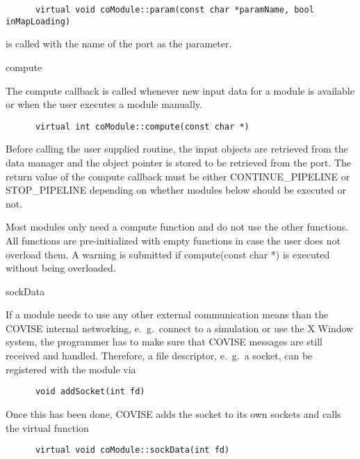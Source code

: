 \begin{verbatim}
      virtual void coModule::param(const char *paramName, bool inMapLoading)
\end{verbatim}

is called with the name of the port as the parameter.

\vspace*{1cm}
{\Large compute}
\vspace*{0.5cm}

The compute callback is called whenever new input data for a module is available or when the user executes a
module manually.
 
\begin{verbatim}
      virtual int coModule::compute(const char *)
\end{verbatim}

Before calling the user supplied routine,
the input objects are retrieved from the data manager and the object pointer is stored 
to be retrieved from the port. The return value of the compute callback must be either 
CONTINUE\_PIPELINE or STOP\_PIPELINE depending on whether modules below should be 
executed or not.

Most modules only need a compute function and do not use the other functions. All 
functions are pre-initialized with empty functions in case the user does not overload 
them. A warning is submitted if compute(const char *) is executed without being overloaded.

\vspace*{1cm}
{\Large sockData}
\vspace*{0.5cm}

If a module needs to use any other external communication means than the COVISE internal
networking, e.~g.\ connect to a simulation or use the X Window system, the programmer has to make 
sure that COVISE messages are still received and handled. Therefore, a file descriptor, 
e.~g.\ a socket, can be registered with the module via

\begin{verbatim}
      void addSocket(int fd)
\end{verbatim}

Once this has been done, COVISE adds the socket to its own sockets and calls the 
virtual function

\begin{verbatim}
      virtual void coModule::sockData(int fd)
\end{verbatim}

